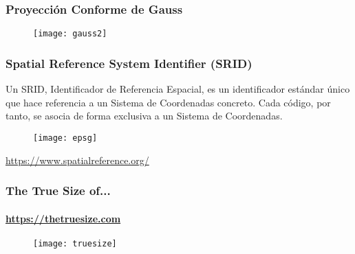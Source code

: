 \documentclass[14pt]{beamer}
\begin{document}
\begin{frame}
\frametitle{Proyección Conforme de Gauss}
  \begin{figure}
    \centering
    \texttt{[image: gauss2]}
  \end{figure}
\end{frame}
\begin{frame}
\frametitle{Spatial Reference System Identifier (SRID)}
\scriptsize{Un SRID, Identificador de Referencia Espacial, es un identificador estándar único que hace referencia a un Sistema de Coordenadas concreto. Cada código, por tanto, se asocia de forma exclusiva a un Sistema de Coordenadas.}
  \begin{figure}
    \centering
    \texttt{[image: epsg]}
  \end{figure}
\url{https://www.spatialreference.org/}
\end{frame}
\begin{frame}
\frametitle{The True Size of...}
\framesubtitle{\url{https://thetruesize.com}}
  \begin{figure}
  \centering
    \texttt{[image: truesize]}
\tiny{}
  \end{figure}
\end{frame}
\end{document}
